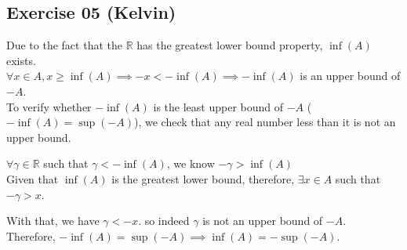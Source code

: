 \subsection*{Exercise 05 (Kelvin)}
Due to the fact that the $\mathbb{R}$ has the greatest lower bound property, $ \inf(A) $ exists.\\

$\forall x \in A, x \ge \inf(A) \implies -x<-\inf(A) \implies -\inf(A)$ is an upper bound of $-A$.\\

To verify whether $-\inf(A)$ is the least upper bound of $-A$ ($-\inf(A) = \sup(-A)$), we check that any real number less than it is not an upper bound.

$\forall \gamma \in \mathbb{R} $ such that $ \gamma < -\inf(A) $, we know $ -\gamma > \inf(A)$ \\

Given that $\inf(A)$ is the greatest lower bound, therefore, $ \exists x \in A$ such that $ -\gamma > x $.

With that, we have $ \gamma < -x $. so indeed $\gamma$ is not an upper bound of $-A$. \\

Therefore, $-\inf(A) = \sup(-A) \implies \inf(A) = -\sup(-A)$.
